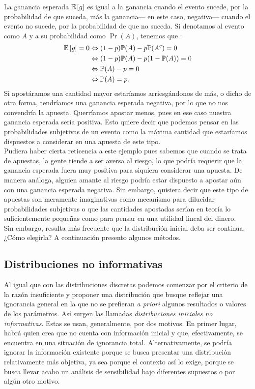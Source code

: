 La ganancia esperada $\mathbb{E}\left[ g \right]$ es igual a la ganancia cuando el evento sucede, por la probabilidad de que suceda, más la ganancia--- en este caso, negativa--- cuando el evento no sucede, por la probabilidad de que no suceda. Si denotamos al evento como $A$ y a su probabilidad como $\Pr(A)$, tenemos que : 
\begin{align*}
\mathbb{E}\left[ g \right] = 0 &\Leftrightarrow (1-p)\mathbb{P}(A) - p\mathbb{P}(A^c) = 0 \\
&\Leftrightarrow (1-p)\mathbb{P}(A) - p(1-\mathbb{P}(A))= 0\\ 
&\Leftrightarrow \mathbb{P}(A) - p = 0\\
&\Leftrightarrow \mathbb{P}(A) = p.
\end{align*}
Si apostáramos una cantidad mayor estaríamos arriesgándonos de más, o dicho de otra forma, tendríamos una ganancia esperada negativa, por lo que no nos convendría la apuesta. Querríamos apostar menos, pues en ese caso nuestra ganancia esperada sería positiva. Esto quiere decir que podemos pensar en las probabilidades subjetivas de un evento como la máxima cantidad que estaríamos dispuestos a considerar en una apuesta de este tipo.\\ 

Pudiera haber cierta reticencia a este ejemplo pues sabemos que cuando se trata de apuestas, la gente tiende a ser aversa al riesgo, lo que podría requerir que la ganancia esperada fuera muy positiva para siquiera considerar una apuesta. De manera análoga, alguien amante al riesgo podría estar dispuesto a apostar aún con una ganancia esperada negativa. Sin embargo, quisiera decir que este tipo de apuestas son meramente imaginativas como mecanismo para dilucidar probabilidades subjetivas o que las cantidades apostadas serían en teoría lo suficientemente pequeñas como para pensar en una utilidad lineal del dinero.\\ 

Sin embargo, resulta más frecuente que la distribución inicial deba ser continua. ¿Cómo elegirla? A continuación presento algunos métodos.  

\subsection{Distribuciones no informativas}

Al igual que con las distribuciones discretas podemos comenzar por el criterio de la razón insuficiente y proponer una distribución que busque reflejar una ignorancia general en la que no se prefieran \textit{a priori} algunos resultados o valores de los parámetros. Así surgen las llamadas \textit{distribuciones iniciales no informativas}. Estas se usan, generalmente, por dos motivos. En primer lugar, habrá quien crea que no cuenta con información inicial y que, efectivamente, se encuentra en una situación de ignorancia total. Alternativamente, se podría ignorar la información existente porque se busca presentar una distribución relativamente más objetiva, ya sea porque el contexto así lo exige, porque se busca llevar acabo un análisis de sensibilidad bajo diferentes supuestos o por algún otro motivo.\\ 

